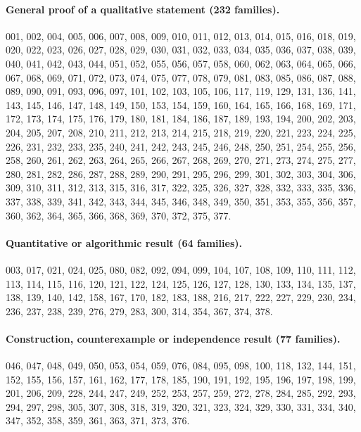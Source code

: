 \documentclass[11pt,a4paper]{article}
\theoremstyle{prob}
\begin{document}
\paragraph{General proof of a qualitative statement (232 families).} {\footnotesize 001, 002, 004, 005, 006, 007, 008, 009, 010, 011, 012, 013, 014, 015, 016, 018, 019, 020, 022, 023, 026, 027, 028, 029, 030, 031, 032, 033, 034, 035, 036, 037, 038, 039, 040, 041, 042, 043, 044, 051, 052, 055, 056, 057, 058, 060, 062, 063, 064, 065, 066, 067, 068, 069, 071, 072, 073, 074, 075, 077, 078, 079, 081, 083, 085, 086, 087, 088, 089, 090, 091, 093, 096, 097, 101, 102, 103, 105, 106, 117, 119, 129, 131, 136, 141, 143, 145, 146, 147, 148, 149, 150, 153, 154, 159, 160, 164, 165, 166, 168, 169, 171, 172, 173, 174, 175, 176, 179, 180, 181, 184, 186, 187, 189, 193, 194, 200, 202, 203, 204, 205, 207, 208, 210, 211, 212, 213, 214, 215, 218, 219, 220, 221, 223, 224, 225, 226, 231, 232, 233, 235, 240, 241, 242, 243, 245, 246, 248, 250, 251, 254, 255, 256, 258, 260, 261, 262, 263, 264, 265, 266, 267, 268, 269, 270, 271, 273, 274, 275, 277, 280, 281, 282, 286, 287, 288, 289, 290, 291, 295, 296, 299, 301, 302, 303, 304, 306, 309, 310, 311, 312, 313, 315, 316, 317, 322, 325, 326, 327, 328, 332, 333, 335, 336, 337, 338, 339, 341, 342, 343, 344, 345, 346, 348, 349, 350, 351, 353, 355, 356, 357, 360, 362, 364, 365, 366, 368, 369, 370, 372, 375, 377.}

\paragraph{Quantitative or algorithmic result (64 families).} {\footnotesize 003, 017, 021, 024, 025, 080, 082, 092, 094, 099, 104, 107, 108, 109, 110, 111, 112, 113, 114, 115, 116, 120, 121, 122, 124, 125, 126, 127, 128, 130, 133, 134, 135, 137, 138, 139, 140, 142, 158, 167, 170, 182, 183, 188, 216, 217, 222, 227, 229, 230, 234, 236, 237, 238, 239, 276, 279, 283, 300, 314, 354, 367, 374, 378.}

\paragraph{Construction, counterexample or independence result (77 families).} {\footnotesize 046, 047, 048, 049, 050, 053, 054, 059, 076, 084, 095, 098, 100, 118, 132, 144, 151, 152, 155, 156, 157, 161, 162, 177, 178, 185, 190, 191, 192, 195, 196, 197, 198, 199, 201, 206, 209, 228, 244, 247, 249, 252, 253, 257, 259, 272, 278, 284, 285, 292, 293, 294, 297, 298, 305, 307, 308, 318, 319, 320, 321, 323, 324, 329, 330, 331, 334, 340, 347, 352, 358, 359, 361, 363, 371, 373, 376.}
\end{document}
